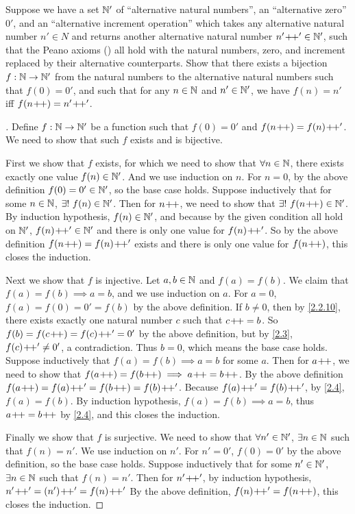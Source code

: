 \begin{ex}\label{ex:3.5.13}
	Suppose we have a set \(\mathbb{N}'\) of ``alternative natural numbers'', an ``alternative zero'' \(0'\), and an ``alternative increment operation'' which takes any alternative natural number \(n' \in N\) and returns another alternative natural number \(n'\!+\!\!+' \in \mathbb{N}'\), such that the Peano axioms () all hold with the natural numbers, zero, and increment replaced by their alternative counterparts.
	Show that there exists a bijection \(f : \mathbb{N} \to \mathbb{N}'\) from the natural numbers to the alternative natural numbers such that \(f(0) = 0'\), and such that for any \(n \in \mathbb{N}\) and \(n' \in \mathbb{N}'\), we have \(f(n) = n'\) iff \(f(n\!+\!\!+) = n'\!+\!\!+'\).
\end{ex}

\begin{proof}[]
	Define \(f : \mathbb{N} \to \mathbb{N}'\) be a function such that \(f(0) = 0'\) and \(f(n\!+\!\!+) = f(n)\!+\!\!+'\).
	We need to show that such \(f\) exists and is bijective.

	First we show that \(f\) exists, for which we need to show that \(\forall n \in \mathbb{N}\), there exists exactly one value \(f(n) \in \mathbb{N}'\).
	And we use induction on \(n\).
	For \(n = 0\), by the above definition \(f(0) = 0' \in \mathbb{N}'\), so the base case holds.
	Suppose inductively that for some \(n \in \mathbb{N}\), \(\exists!\ f(n) \in \mathbb{N}'\).
	Then for \(n\!+\!\!+\), we need to show that \(\exists!\ f(n\!+\!\!+) \in \mathbb{N}'\).
	By induction hypothesis, \(f(n) \in \mathbb{N}'\), and because by the given condition  all hold on \(\mathbb{N}'\), \(f(n)\!+\!\!+' \in \mathbb{N}'\) and there is only one value for \(f(n)\!+\!\!+'\).
	So by the above definition \(f(n\!+\!\!+) = f(n)\!+\!\!+'\) exists and there is only one value for \(f(n\!+\!\!+)\), this closes the induction.

	Next we show that \(f\) is injective.
	Let \(a, b \in \mathbb{N}\) and \(f(a) = f(b)\).
	We claim that \(f(a) = f(b) \implies a = b\), and we use induction on \(a\).
	For \(a = 0\), \(f(a) = f(0) = 0' = f(b)\) by the above definition.
	If \(b \neq 0\), then by \cref{2.2.10}, there exists exactly one natural number \(c\) such that \(c\!+\!\!+ = b\).
	So \(f(b) = f(c\!+\!\!+) = f(c)\!+\!\!+' = 0'\) by the above definition, but by \cref{2.3}, \(f(c)\!+\!\!+' \neq 0'\), a contradiction.
	Thus \(b = 0\), which means the base case holds.
	Suppose inductively that \(f(a) = f(b) \implies a = b\) for some \(a\).
	Then for \(a\!+\!\!+\), we need to show that \(f(a\pp) = f(b\pp) \implies a\pp = b\pp\).
	By the above definition \(f(a\pp) = f(a)\pp' = f(b\pp) = f(b)\pp'\).
	Because \(f(a)\!+\!\!+' = f(b)\!+\!\!+'\), by \cref{2.4}, \(f(a) = f(b)\).
	By induction hypothesis, \(f(a) = f(b) \implies a = b\), thus \(a\!+\!\!+ = b\!+\!\!+\) by \cref{2.4}, and this closes the induction.

	Finally we show that \(f\) is surjective.
	We need to show that \(\forall n' \in \mathbb{N}'\), \(\exists n \in \mathbb{N}\) such that \(f(n) = n'\).
	We use induction on \(n'\).
	For \(n' = 0'\), \(f(0) = 0'\) by the above definition, so the base case holds.
	Suppose inductively that for some \(n' \in \mathbb{N}'\), \(\exists n \in \mathbb{N}\) such that \(f(n) = n'\).
	Then for \(n'\!+\!\!+'\), by induction hypothesis, \(n'\pp' = (n')\pp' = f(n)\pp'\)
	By the above definition, \(f(n)\!+\!\!+' = f(n\!+\!\!+)\), this closes the induction.
\end{proof}
